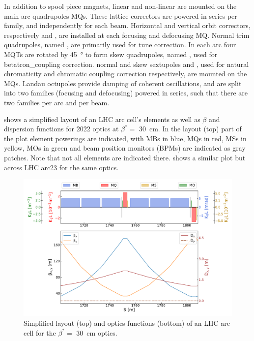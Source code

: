In addition to spool piece magnets, linear and non-linear  are mounted on the main arc quadrupoles MQs.
These lattice correctors are powered in series per family, and independently for each beam.
Horizontal and vertical orbit correctors, respectively  and , are installed at each focusing and defocusing MQ.
Normal \gls{trim} quadrupoles, named , are primarily used for tune correction.
In each arc four MQTs are rotated by \qty{45}{\degree} to form \gls{skew} quadrupoles, named , used for \gls{betatron_coupling} correction.
\Gls{normal} and \gls{skew} sextupoles  and , used for natural chromaticity and chromatic coupling correction respectively, are mounted on the MQs.
Landau octupoles  provide damping of coherent oscillations, and are split into two families (focusing and defocusing) powered in series, such that there are two families per arc and per beam.
\break

 shows a simplified layout of an LHC arc cell's elements as well as \(\beta\) and dispersion functions for \num{2022} optics at \(\beta^{\ast} =\) \qty{30}{\centi\meter}.
In the layout (top) part of the plot element powerings are indicated, with MBs in \textcolor{mplblue}{blue}, MQs in \textcolor{latwiss_red}{red}, MSs in \textcolor{latwiss_yellow}{yellow}, MOs in \textcolor{latwiss_green}{green} and beam position monitors (BPMs) are indicated as gray patches.
Note that not all elements are indicated there.
 shows a similar plot but across LHC arc\num{23} for the same optics.

\begin{figure}[!hbt]
  \centering
  \includegraphics*[width=\linewidth]{Figures/Optics_Measurements_Corrections_at_LHC/lhc_arc_cell.pdf}
  \caption{Simplified layout (top) and optics functions (bottom) of an LHC arc cell for the \(\beta^{\ast} =\) \qty{30}{\centi\meter} optics.}
  \label{figure:lhc_arc_cell_latwiss}
\end{figure}

